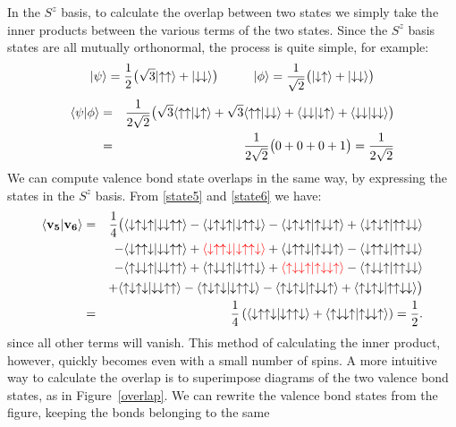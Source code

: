 In the $S^z$ basis, to calculate the overlap between two states we simply take the inner products 
between the various terms of the two states.  
Since the $S^z$ basis states are all mutually orthonormal, the process is quite simple, for example:
\begin{equation*}
\ket{\psi} = \frac{1}{2}\big(\sqrt{3}\ket{\up\up} + \ket{\dw\dw}\big) \hspace{1cm}
\ket{\phi} = \frac{1}{\sqrt{2}} \big(\ket{\dw\up} + \ket{\dw\dw}\big) \nonumber
\end{equation*}
\begin{eqnarray}
\inn{\psi}{\phi}&=& \frac{1}{2\sqrt{2}}\big(
		\sqrt{3}\inn{\up\up}{\dw\up} + \sqrt{3}\inn{\up\up}{\dw\dw} +
		\inn{\dw\dw}{\dw\up} + \inn{\dw\dw}{\dw\dw}
		\big) \nonumber \\
		&=& \frac{1}{2\sqrt{2}}\big(
		0 + 0 +
		0 +1
		\big)
		= \frac{1}{2\sqrt{2}}
\end{eqnarray}
We can compute valence bond state overlaps in the same way, by expressing the states in the
$S^z$ basis.  From \eqref{state5} and \eqref{state6} we have:
\begin{eqnarray}
\inn{\mathbf{v_5}}{\mathbf{v_6}} &=& 	 
	 \frac{1}{4} 
	 \big(	
		\inn{\dw\up\dw\up}{\dw\dw\up\up} - \inn{\dw\up\dw\up}{\dw\up\up\dw} \nonumber
		- \inn{\dw\up\dw\up}{\up\dw\dw\up} + \inn{\dw\up\dw\up}{\up\up\dw\dw} \\				
		&&-\inn{\dw\up\up\dw}{\dw\dw\up\up} + \comment{\inn{\dw\up\up\dw}{\dw\up\up\dw}}
		+ \inn{\dw\up\up\dw}{\up\dw\dw\up} - \inn{\dw\up\up\dw}{\up\up\dw\dw}	\nonumber\\	
		&&-\inn{\up\dw\dw\up}{\dw\dw\up\up} + \inn{\up\dw\dw\up}{\dw\up\up\dw}\nonumber
	+\comment{ \inn{\up\dw\dw\up}{\up\dw\dw\up}} - \inn{\up\dw\dw\up}{\up\up\dw\dw}	\\	
		&&+\inn{\up\dw\up\dw}{\dw\dw\up\up} - \inn{\up\dw\up\dw}{\dw\up\up\dw}
		- \inn{\up\dw\up\dw}{\up\dw\dw\up} + \inn{\up\dw\up\dw}{\up\up\dw\dw}
	 \big) \\	 
	&=& \frac{1}{4} \nonumber
	\left(
		\inn{\dw\up\up\dw}{\dw\up\up\dw} + \inn{\up\dw\dw\up}{\up\dw\dw\up}
	 \right) 
	 = \frac{1}{2}.\nonumber
\end{eqnarray}
since all other terms will vanish.  
This method of calculating the inner product, however, quickly becomes  even with a small number of spins.
A more intuitive way to calculate the overlap is to superimpose diagrams of the two valence bond states, as in Figure~\ref{overlap}.
We can rewrite the valence bond states from the figure, keeping the bonds belonging to the same 
